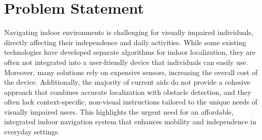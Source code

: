 \section{Problem Statement}
Navigating indoor environments is challenging for visually impaired individuals, directly affecting their independence and daily activities. While some existing technologies have developed separate algorithms for indoor localization, they are often not integrated into a user-friendly device that individuals can easily use. Moreover, many solutions rely on expensive sensors, increasing the overall cost of the device. Additionally, the majority of current aids do not provide a cohesive approach that combines accurate localization with obstacle detection, and they often lack context-specific, non-visual instructions tailored to the unique needs of visually impaired users. This highlights the urgent need for an affordable, integrated indoor navigation system that enhances mobility and independence in everyday settings.